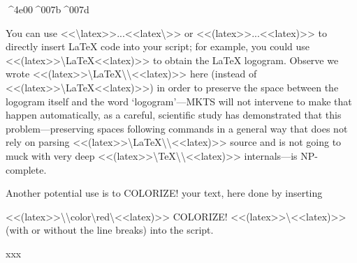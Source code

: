 
^^^^4e00^^^^007b^^^^007d

\begin{multicols}{2}
You can use {\mktsStyleCode{}<<\textbackslash{}{latex>>...<<latex\textbackslash{}}>>} or {\mktsStyleCode{}<<(latex>>...<<latex)>>} to directly insert LaTeX
code into your script; for example, you could
use {\mktsStyleCode{}<<(latex>>\textbackslash{}LaTeX<<latex)>>}
to obtain the \LaTeX{} logogram.
Observe we wrote {\mktsStyleCode{}<<(latex>>\textbackslash{}LaTeX\textbackslash{}{\textbackslash{}}<<latex)>>} here
(instead of {\mktsStyleCode{}<<(latex>>\textbackslash{}LaTeX<<latex)>>}){}
in order to preserve the space between the logogram itself and
the word ‘logogram’—MKTS will not intervene to make that happen
automatically, as a careful, scientific study has demonstrated
that this problem—preserving spaces following commands in a
general way that does not rely on parsing {\mktsStyleCode{}<<(latex>>\textbackslash{}LaTeX\textbackslash{}{\textbackslash{}}<<latex)>>}
source and is not going to muck with very deep
{\mktsStyleCode{}<<(latex>>\textbackslash{}TeX\textbackslash{}{\textbackslash{}}<<latex)>>}
internals—is NP-complete.\mktsShowpar\par
Another potential use is to {\color{red}COLORIZE!} your text, here done by inserting\mktsShowpar\par
\begingroup\obeyalllines\mktsStyleCode{}<<(latex>>\textbackslash{}{\textbackslash{}color\textbackslash{}{red\textbackslash{}}<<latex)>>
COLORIZE!
<<(latex>>\textbackslash{}}<<latex)>>
\endgroup{}(with or without the line breaks) into the script.
\end{multicols}xxx\mktsShowpar\par

